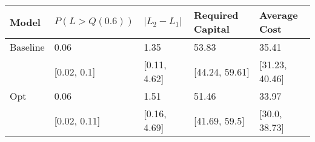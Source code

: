 \begin{tabular}{lllll}
\toprule
   Model & $P(L > Q(0.6))$ & $|L_2 - L_1|$ & Required Capital &   Average Cost \\
\midrule
Baseline &            0.06 &          1.35 &            53.83 &          35.41 \\
         &     [0.02, 0.1] &  [0.11, 4.62] &   [44.24, 59.61] & [31.23, 40.46] \\
     Opt &            0.06 &          1.51 &            51.46 &          33.97 \\
         &    [0.02, 0.11] &  [0.16, 4.69] &    [41.69, 59.5] &  [30.0, 38.73] \\
\bottomrule
\end{tabular}

